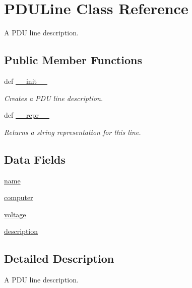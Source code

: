 \hypertarget{classsettings__classes_1_1_p_d_u_line}{\section{\-P\-D\-U\-Line \-Class \-Reference}
\label{classsettings__classes_1_1_p_d_u_line}
}


\-A \-P\-D\-U line description.  


\subsection*{\-Public \-Member \-Functions}
\begin{DoxyCompactItemize}
\item 
def \hyperlink{classsettings__classes_1_1_p_d_u_line_ac775ee34451fdfa742b318538164070e}{\-\_\-\-\_\-init\-\_\-\-\_\-}
\begin{DoxyCompactList}\small\item\em \-Creates a \-P\-D\-U line description. \end{DoxyCompactList}\item 
def \hyperlink{classsettings__classes_1_1_p_d_u_line_ad8b9328939df072e4740cd9a63189744}{\-\_\-\-\_\-repr\-\_\-\-\_\-}
\begin{DoxyCompactList}\small\item\em \-Returns a string representation for this line. \end{DoxyCompactList}\end{DoxyCompactItemize}
\subsection*{\-Data \-Fields}
\begin{DoxyCompactItemize}
\item 
\hyperlink{classsettings__classes_1_1_p_d_u_line_ab74e6bf80237ddc4109968cedc58c151}{name}
\item 
\hyperlink{classsettings__classes_1_1_p_d_u_line_a98f8cb986fbbcd435b452dc91dc6e8c1}{computer}
\item 
\hyperlink{classsettings__classes_1_1_p_d_u_line_aa1a8261d8fb901476651f1666f993d4b}{voltage}
\item 
\hyperlink{classsettings__classes_1_1_p_d_u_line_a2661f439a4a94ffdcd5e47ae1da0bb1d}{description}
\end{DoxyCompactItemize}


\subsection{\-Detailed \-Description}
\-A \-P\-D\-U line description. 

